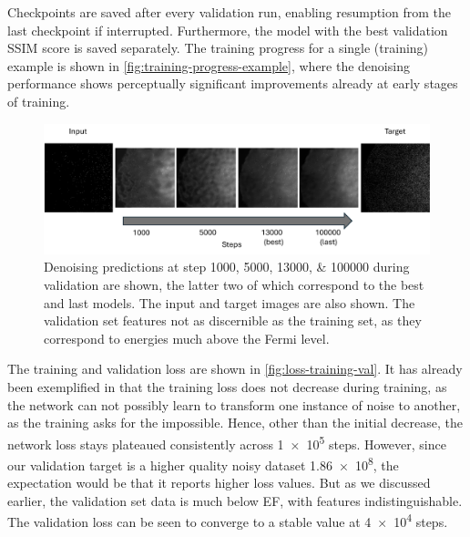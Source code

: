 Checkpoints are saved after every validation run, enabling resumption from the last checkpoint if interrupted. Furthermore, the model with the best validation \gls{SSIM} score is saved separately. The training progress for a single (training) example is shown in \cref{fig:training-progress-example}, where the denoising performance shows perceptually significant improvements already at early stages of training.

\begin{figure}
    \centering
    \includegraphics[width=1\linewidth]{images/val_over_time.pdf}
    \caption{Denoising predictions at step \numlist{1000;5000;13000;100000} during validation are shown, the latter two of which correspond to the best and last models. The input and target images are also shown. The validation set features not as discernible as the training set, as they correspond to energies much above the Fermi level.}
    \label{fig:val-progress-example}
\end{figure}

The training and validation loss are shown in \cref{fig:loss-training-val}. It has already been exemplified in \cite{lehtinenNoise2NoiseLearningImage2018} that the training loss does not decrease during training, as the network can not possibly learn to transform one instance of noise to another, as the training asks for the impossible. Hence, other than the initial decrease, the network loss stays plateaued consistently across \num{1e5} steps. However, since our validation target is a higher quality noisy dataset \num{1.86e8}, the expectation would be that it reports higher loss values. But as we discussed earlier, the validation set data is much below \gls{EF}, with features indistinguishable. The validation loss can be seen to converge to a stable value at \num{4e4} steps. 

